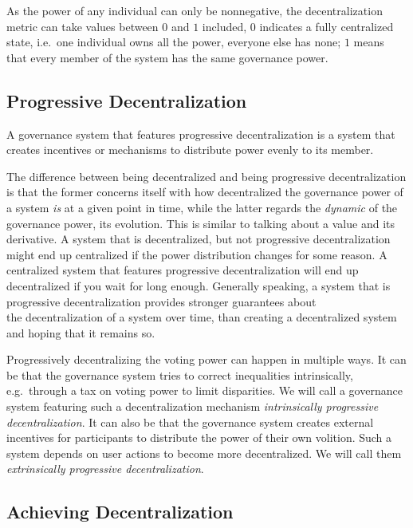 As the power of any individual can only be nonnegative, the decentralization metric can take values between $0$ and $1$ included, $0$ indicates a fully centralized state, i.e.\ one individual owns all the power, everyone else has none; $1$ means that every member of the system has the same governance power.

\subsection{Progressive Decentralization}

\begin{property}
  \label{prop:progressive_decentralization}
  A governance system that features progressive decentralization is a system that creates incentives or mechanisms to distribute power evenly to its member.
\end{property}

The difference between being decentralized and being progressive decentralization is that the former concerns itself with how decentralized the governance power of a system \emph{is} at a given point in time, while the latter regards the \emph{dynamic} of the governance power, its evolution.
This is similar to talking about a value and its derivative.
A system that is decentralized, but not progressive decentralization might end up centralized if the power distribution changes for some reason.
A centralized system that features progressive decentralization will end up decentralized if you wait for long enough.
Generally speaking, a system that is progressive decentralization provides stronger guarantees about\\the decentralization of a system over time, than creating a decentralized system and hoping that it remains so.

Progressively decentralizing the voting power can happen in multiple ways.
It can be that the governance system tries to correct inequalities intrinsically, e.g.\ through a tax on voting power to limit disparities.
We will call a governance system featuring such a decentralization mechanism \textit{intrinsically progressive decentralization}.
It can also be that the governance system creates external incentives for participants to distribute the power of their own volition.
Such a system depends on user actions to become more decentralized.
We will call them \textit{extrinsically progressive decentralization}.

\subsection{Achieving Decentralization}

